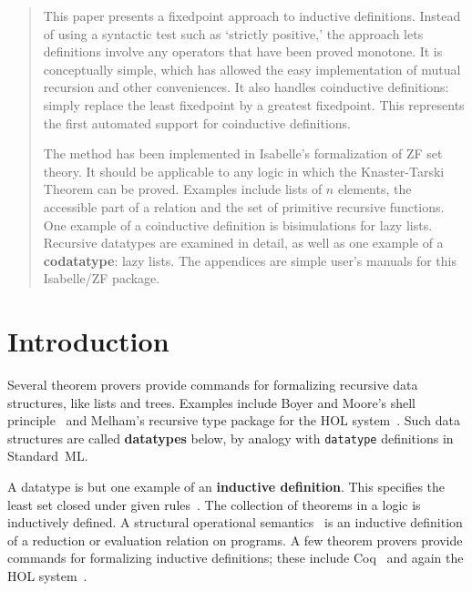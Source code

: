 \binperiod     %


\maketitle 
\begin{abstract}
  This paper presents a fixedpoint approach to inductive definitions.
  Instead of using a syntactic test such as `strictly positive,' the
  approach lets definitions involve any operators that have been proved
  monotone.  It is conceptually simple, which has allowed the easy
  implementation of mutual recursion and other conveniences.  It also
  handles coinductive definitions: simply replace the least fixedpoint by a
  greatest fixedpoint.  This represents the first automated support for
  coinductive definitions.

  The method has been implemented in Isabelle's formalization of ZF set
  theory.  It should be applicable to any logic in which the Knaster-Tarski
  Theorem can be proved.  Examples include lists of $n$ elements, the
  accessible part of a relation and the set of primitive recursive
  functions.  One example of a coinductive definition is bisimulations for
  lazy lists.  \ifCADE\else Recursive datatypes are examined in detail, as
  well as one example of a {\bf codatatype}: lazy lists.  The appendices
  are simple user's manuals for this Isabelle/ZF package.\fi
\end{abstract}
%

\section{Introduction}
Several theorem provers provide commands for formalizing recursive data
structures, like lists and trees.  Examples include Boyer and Moore's shell
principle~\cite{bm79} and Melham's recursive type package for the HOL
system~\cite{melham89}.  Such data structures are called {\bf datatypes}
below, by analogy with {\tt datatype} definitions in Standard~ML\@.

A datatype is but one example of an {\bf inductive definition}.  This
specifies the least set closed under given rules~\cite{aczel77}.  The
collection of theorems in a logic is inductively defined.  A structural
operational semantics~\cite{hennessy90} is an inductive definition of a
reduction or evaluation relation on programs.  A few theorem provers
provide commands for formalizing inductive definitions; these include
Coq~\cite{paulin92} and again the HOL system~\cite{camilleri92}.


